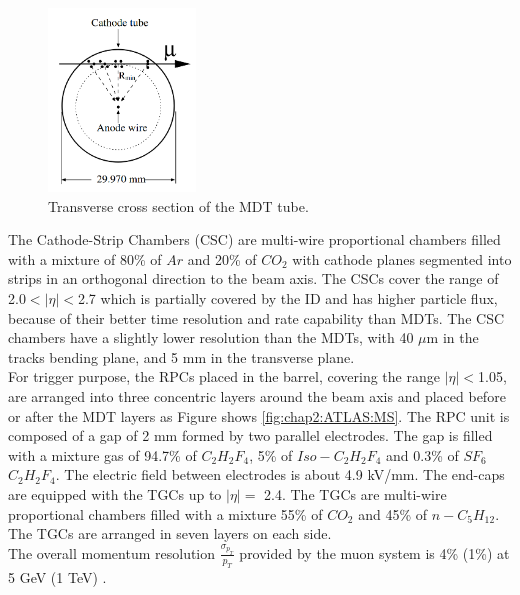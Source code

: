 \begin{figure}[htbp]
    \centering
    \includegraphics[width=0.35\textwidth]{Ch2/Img/Tube.png}
    \caption{Transverse cross section of the MDT tube.}
    \label{fig:chap2:ATLAS:MS:Tube}
\end{figure}
The Cathode-Strip Chambers (CSC) are multi-wire proportional chambers filled with a mixture of 80\% of $Ar$ and 20\% of $CO_2$ with cathode planes segmented into strips in an orthogonal direction to the beam axis. The CSCs cover the range of 2.0$<|\eta|<$2.7 which is partially covered by the ID and has higher particle flux, because of their better time resolution and rate capability than MDTs. The CSC chambers have a slightly lower resolution than the MDTs, with 40 $\mu$m in the tracks bending plane, and 5 mm in the transverse plane. \\
For trigger purpose, the RPCs placed in the barrel, covering the range $|\eta|<$1.05,  are arranged into three concentric layers around the beam axis and placed before or after the MDT layers as Figure shows \ref{fig:chap2:ATLAS:MS}. The RPC unit is composed of a gap of 2 mm formed by two parallel electrodes. The gap is filled with a mixture gas of 94.7\% of $C_2H_2F_4$, 5\% of $Iso-C_2H_2F_4$ and 0.3\% of $SF_6$ $C_2H_2F_4$. The electric field between electrodes is about 4.9 kV/mm. The end-caps are equipped with the TGCs up to $|\eta|=$ 2.4. The TGCs are multi-wire proportional chambers filled with a mixture 55\% of $CO_2$ and 45\% of $n-C_5H_{12}$. The TGCs are arranged in seven layers on each side.\\
The overall momentum resolution $\frac{\sigma_{p_T}}{p_T}$ provided by the muon system is 4\% (1\%) at 5 GeV (1 TeV) \cite{ATLAS_Perf}.

